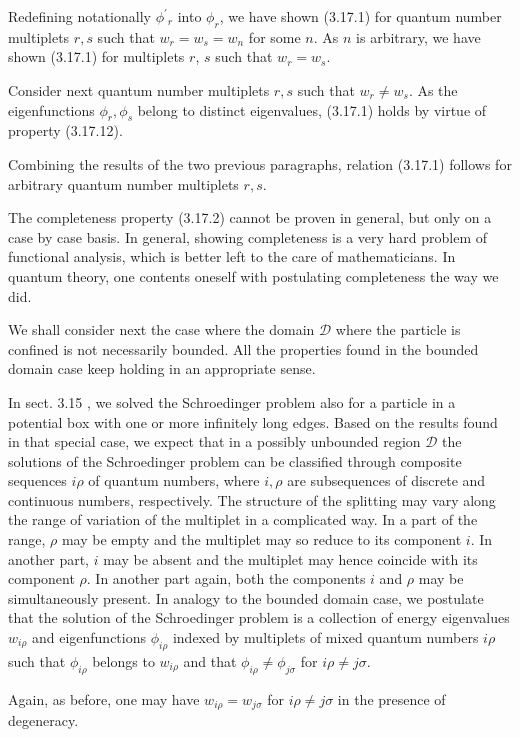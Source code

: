 \documentclass{article}
\begin{document}
Redefining notationally $\phi^{\prime}{ }_{r}$ into $\phi_{r}$, we have shown (3.17.1) for quantum number multiplets $r, s$ such that $w_{r}=w_{s}=w_{n}$ for some $n$. As $n$ is arbitrary, we have shown (3.17.1) for multiplets $r$, $s$ such that $w_{r}=w_{s}$.

Consider next quantum number multiplets $r, s$ such that $w_{r} \neq w_{s}$. As the eigenfunctions $\phi_{r}, \phi_{s}$ belong to distinct eigenvalues, (3.17.1) holds by virtue of property (3.17.12).

Combining the results of the two previous paragraphs, relation (3.17.1) follows for arbitrary quantum number multiplets $r, s$.

The completeness property (3.17.2) cannot be proven in general, but only on a case by case basis. In general, showing completeness is a very hard problem of functional analysis, which is better left to the care of mathematicians. In quantum theory, one contents oneself with postulating completeness the way we did.

We shall consider next the case where the domain $\mathcal{D}$ where the particle is confined is not necessarily bounded. All the properties found in the bounded domain case keep holding in an appropriate sense.

In sect. 3.15 , we solved the Schroedinger problem also for a particle in a potential box with one or more infinitely long edges. Based on the results found in that special case, we expect that in a possibly unbounded region $\mathcal{D}$ the solutions of the Schroedinger problem can be classified through composite sequences $i \rho$ of quantum numbers, where $i, \rho$ are subsequences of discrete and continuous numbers, respectively. The structure of the splitting may vary along the range of variation of the multiplet in a complicated way. In a part of the range, $\rho$ may be empty and the multiplet may so reduce to its component $i$. In another part, $i$ may be absent and the multiplet may hence coincide with its component $\rho$. In another part again, both the components $i$ and $\rho$ may be simultaneously present. In analogy to the bounded domain case, we postulate that
the solution of the Schroedinger problem is a collection of energy eigenvalues $w_{i \rho}$ and eigenfunctions $\phi_{i \rho}$ indexed by multiplets of mixed quantum numbers $i \rho$ such that $\phi_{i \rho}$ belongs to $w_{i \rho}$ and that $\phi_{i \rho} \neq \phi_{j \sigma}$ for $i \rho \neq j \sigma$.

Again, as before, one may have $w_{i \rho}=w_{j \sigma}$ for $i \rho \neq j \sigma$ in the presence of degeneracy.
\end{document}
